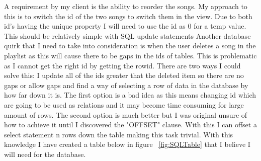 \documentclass{article}
\begin{document}
A requirement by my client is the ability to reorder the songs. My approach
to this is to switch the id of the two songs to switch them in the view.
Due to both id's having the unique property I will need to use the id as
0 for a temp value. This should be relatively simple with SQL update statements
Another database quirk that I need to take into consideration is when the user
deletes a song in the playlist as this will cause there to be gaps in the
ids of tables. This is problematic as I cannot get the right id by getting
the rowid. There are two ways I could solve this: I update all of the ids
greater that the deleted item so there are no gaps or allow gaps and find
a way of selecting a row of data in the database by how far down it is.
The first option is a bad idea as this means changing id which are going
to be used as relations and it may become time consuming for large
amount of rows. The second option is much better but I was original unsure
of how to achieve it until I discovered the "OFFSET" clause. With this
I can offset a select statement n rows down the table making this task
trivial.
With this knowledge I have created a table below in figure ~\ref{fig:SQLTable}
that I believe I will need for the database.
\end{document}
